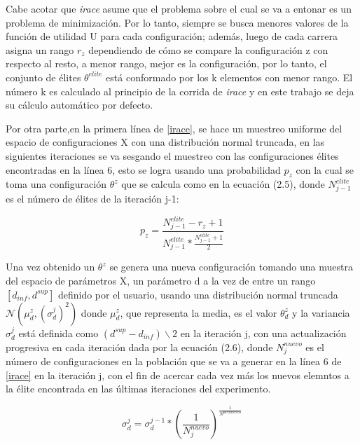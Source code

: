 Cabe acotar que \emph{irace} asume que el problema sobre el cual se va a entonar es un problema de minimización. Por lo tanto, siempre se busca menores valores de la función de utilidad U para cada configuración; además, luego de cada carrera asigna un rango $r_z$ dependiendo de cómo se compare la configuración z con respecto al resto, a menor rango, mejor es la configuración, por lo tanto, el conjunto de élites $\theta^{elite}$ está conformado por los k elementos con menor rango. El número k es calculado al principio de la corrida de \emph{irace} y en este trabajo se deja su cálculo automático por defecto.

Por otra parte,en la primera línea de \ref{irace}, se hace un muestreo uniforme del espacio de configuraciones X con una distribución normal truncada, en las siguientes iteraciones se va sesgando el muestreo con las configuraciones élites encontradas en la línea 6, esto se logra usando una probabilidad $p_z$ con la cual se toma una configuración $ \theta^z$ que se calcula como en la ecuación (2.5), donde $N^{elite}_{j-1}$ es el número de élites de la iteración j-1:

\begin{equation}
p_z = \frac{N^{elite}_{j-1} - r_z + 1}{N^{elite}_{j-1}*\frac{N^{elite}_{j-1}+1}{2}}
\end{equation} 

Una vez obtenido un $\theta^z$ se genera una nueva configuración tomando una muestra del espacio de parámetros X, un parámetro d a la vez de entre un rango $[d_{inf},d^{sup}]$ definido por el usuario, usando una distribución normal truncada $\mathcal{N}(\mu^z_d,(\sigma^j_d)^2)$ donde $\mu^z_d$, que representa la media, es el valor $\theta^z_d$ y la variancia $\sigma^j_d$ está definida como $(d^{sup}-d_{inf}) \backslash 2 $ en la iteración j, con una actualización progresiva  en cada iteración dada por la ecuación (2.6), donde $N^{nuevo}_j$ es el número de configuraciones en la población que se va a generar en la línea 6 de \ref{irace} en la iteración j, con el fin de acercar cada vez más los nuevos elemntos a la élite encontrada en las últimas iteraciones del experimento.

\begin{equation}
\sigma^j_d = \sigma^{j-1}_d *\left(\frac{1}{N^{nuevo}_j}\right)^{\frac{1}{N^{parámetros}}}
\end{equation}

